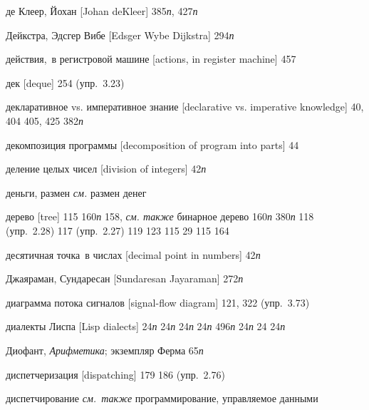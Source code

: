 \begin{theindex}
\item {де Клеер, Йохан [Johan deKleer]} 385{\it п}, 427{\it п}
\item {Дейкстра, Эдсгер Вибе [Edsger Wybe Dijkstra]} 294{\it п}
\item {действия,~в регистровой машине [actions, in register machine]} 457
\item {дек [deque]} 254 (упр.~3.23)
\item {декларативное vs. императивное знание [declarative vs. imperative knowledge]} 40, 404
   405, 425
   382{\it п}
\item {декомпозиция программы [decomposition of program into parts]} 44
\item {деление целых чисел [division of integers]} 42{\it п}
\item {деньги, размен} {\it см.} размен денег
\item {дерево [tree]} 115
   160{\it п}
   158, {\it см. также} бинарное дерево
   160{\it п}
   380{\it п}
   118 (упр.~2.28)
   117 (упр.~2.27)
   119
   123
   115
   29
   115
   164
\item {десятичная точка~в числах [decimal point in numbers]} 42{\it п}
\item {Джаяраман, Сундаресан [Sundaresan Jayaraman]} 272{\it п}
\item {диаграмма потока сигналов [signal-flow diagram]} 121, 322 (упр.~3.73)
\item {диалекты Лиспа [Lisp dialects]}
   24{\it п}
   24{\it п}
   24{\it п}
   24{\it п}
   496{\it п}
   24{\it п}
   24
   24{\it п}
\item {Диофант, \emph{Арифметика}; экземпляр Ферма} 65{\it п}
\item {диспетчеризация [dispatching]}
   179
   186 (упр.~2.76)
\item {диспетчирование}
   {\it см.~также} программирование, управляемое данными

\end{theindex}

